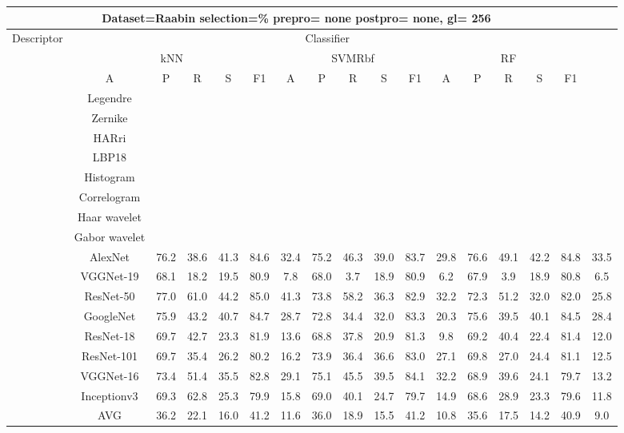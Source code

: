\documentclass[12pt,italian]{article}
\begin{document}
\begin{tiny}
 \pagebreak 
\begin{longtable}{lcccccccccccccccc}
\toprule
\multicolumn{16}{c}{Dataset=Raabin selection=\% prepro= none postpro= none, gl= 256} \\ 
\toprule
Descriptor & \multicolumn{15}{c}{Classifier} \\ 
& \multicolumn{5}{c}{kNN} & \multicolumn{5}{c}{SVMRbf} & \multicolumn{5}{c}{RF} \\ 
& A & P & R & S & F1 & A & P & R & S & F1 & A & P & R & S & F1 \\ 
\midrule
& Legendre \\ 
& Zernike \\ 
& HARri \\ 
& LBP18 \\ 
& Histogram \\ 
& Correlogram \\ 
& Haar wavelet \\ 
& Gabor wavelet \\ 
& AlexNet & 76.2 & 38.6 & 41.3 & 84.6 & 32.4 & 75.2 & 46.3 & 39.0 & 83.7 & 29.8 & 76.6 & 49.1 & 42.2 & 84.8 & 33.5 \\ 
& VGGNet-19 & 68.1 & 18.2 & 19.5 & 80.9 &  7.8 & 68.0 &  3.7 & 18.9 & 80.9 &  6.2 & 67.9 &  3.9 & 18.9 & 80.8 &  6.5 \\ 
& ResNet-50 & 77.0 & 61.0 & 44.2 & 85.0 & 41.3 & 73.8 & 58.2 & 36.3 & 82.9 & 32.2 & 72.3 & 51.2 & 32.0 & 82.0 & 25.8 \\ 
& GoogleNet & 75.9 & 43.2 & 40.7 & 84.7 & 28.7 & 72.8 & 34.4 & 32.0 & 83.3 & 20.3 & 75.6 & 39.5 & 40.1 & 84.5 & 28.4 \\ 
& ResNet-18 & 69.7 & 42.7 & 23.3 & 81.9 & 13.6 & 68.8 & 37.8 & 20.9 & 81.3 &  9.8 & 69.2 & 40.4 & 22.4 & 81.4 & 12.0 \\ 
& ResNet-101 & 69.7 & 35.4 & 26.2 & 80.2 & 16.2 & 73.9 & 36.4 & 36.6 & 83.0 & 27.1 & 69.8 & 27.0 & 24.4 & 81.1 & 12.5 \\ 
& VGGNet-16 & 73.4 & 51.4 & 35.5 & 82.8 & 29.1 & 75.1 & 45.5 & 39.5 & 84.1 & 32.2 & 68.9 & 39.6 & 24.1 & 79.7 & 13.2 \\ 
& Inceptionv3 & 69.3 & 62.8 & 25.3 & 79.9 & 15.8 & 69.0 & 40.1 & 24.7 & 79.7 & 14.9 & 68.6 & 28.9 & 23.3 & 79.6 & 11.8 \\ 
\hline
& AVG & 36.2 & 22.1 & 16.0 & 41.2 & 11.6 & 36.0 & 18.9 & 15.5 & 41.2 & 10.8 & 35.6 & 17.5 & 14.2 & 40.9 &  9.0 \\ 
\hline
\bottomrule
\end{longtable} 

 \pagebreak 
\end{tiny} 
 
\end{document}
